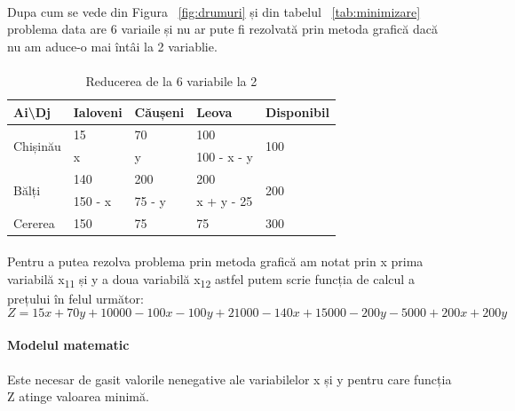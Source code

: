 \paragraph{}
Dupa cum se vede din Figura ~\ref{fig:drumuri} și din tabelul
~\ref{tab:minimizare} problema data are 6 variaile și nu ar pute fi rezolvată
prin metoda grafică dacă nu am aduce-o mai întâi la 2 variablie.


\paragraph{}
\begin{table}[h]
\captionsetup{singlelinecheck = false, justification=raggedright}
\caption{Reducerea de la 6 variabile la 2}
\label{tab:reducere_min} 
\begin{center}
\begin{tabular}{|l|l|l|l|l|} 
\hline
Ai\textbackslash{}Dj& Ialoveni & Căușeni & Leova & Disponibil\\ 
\hline
\multirow{2}{*}{Chișinău} & 15 & 70& 100& \multirow{2}{*}{100}  \\
  & x  & y & 100 - x - y &  \\ 
\hline
\multirow{2}{*}{Bălți} & 140& 200  & 200& \multirow{2}{*}{200}  \\
  & 150 - x  & 75 - y  & x + y - 25  &  \\ 
\hline
Cererea & 150& 75& 75 & 300 \\
\hline
\end{tabular}
\end{center}
\end{table}


\paragraph{}
	Pentru a putea rezolva problema prin metoda grafică am notat prin x prima variabilă x\textsubscript{11} și y a doua variabilă x\textsubscript{12} astfel putem scrie funcția de calcul a prețului în felul următor:
\begin{equation*}
Z = 15x + 70y +10000 -100x -100y +21000 -140x + 15000 - 200y - 5000 + 200x + 200y
\end{equation*}

\paragraph{Modelul matematic}
Este necesar de gasit valorile nenegative ale variabilelor x și y pentru care funcția Z atinge valoarea minimă.

